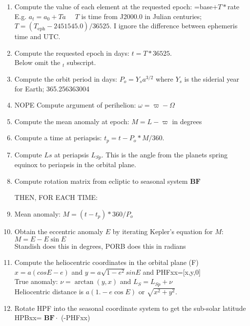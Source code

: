 \documentclass[draft]{article}
\newcommand{\qi}{\\ \hspace*{2.em}}      %
\newcommand{\qii}{\\ \hspace*{4.em}}     %
\newcommand{\qiii}{\\ \hspace*{6.em}}    %
\newcommand{\qdp}{$. \! ^\circ \! $} %
\begin{document}
\begin{enumerate}    %
\item  Compute the value of each element at the requested epoch: =base$+T\ast$rate
\qii E.g. $a_t=a_0+ T\dot{a}$  \ \ $T$ is time from J2000.0 in Julian centuries;
\qii  $T=\left( T_\mathrm{eph}-2451545.0 \right)/36525. $ I ignore the difference between ephemeris time and UTC. 
\item Compute the requested epoch in days: $ t=T*36525.$
\qi Below omit the $_t$ subscript.
\item Compute the orbit period in days: $P_o= Y_s a^{3/2}$ where $Y_s$ is the siderial year for Earth; 365.256363004
\item NOPE Compute argument of perihelion: $ \omega=\varpi-\Omega$
\item Compute the mean anomaly at epoch: $M=L-\varpi $ in degrees
\item Compute a time at periapsis: $t_p=   t-P_o*M/360.$
\item Compute $Ls$ at periapsis $L_{Sp}$. This is the angle from the planets spring equinox to periapsis in the orbital plane.
\item Compute rotation matrix from ecliptic to seasonal system $\mathbf{BF}$

 THEN, FOR EACH TIME:

\item Mean anomaly: $  M=(t-t_p)* 360/P_o $
\item Obtain the eccentric anomaly $E$ by iterating Kepler's equation for $M$:
\qiii $M= E- E \sin E $
\qi Standish does this in degrees, PORB does this in radians
\item Compute the heliocentric coordinates in the orbital plane (F)
\qi $x =a(cos E-e)$ and $ y=a \sqrt{1-e^2} sin E$ and PHFxx=[x,y,0]
\qi True anomaly: $ \nu =\arctan (y,x)$ and $L_S = L_{Sp}+\nu $
\qi Heliocentric distance is $a( 1.-e \cos E )$ or $\sqrt{x^2 + y^2}$.
\item Rotate HPF into the seasonal coordinate system to get the sub-solar latitude
\qi HPBxx= $\mathbf{BF} \cdot $ (-PHFxx)


\end{enumerate}
\end{document}
